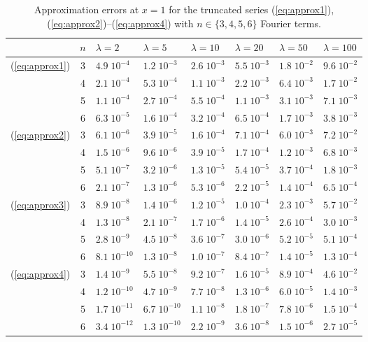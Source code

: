 \documentclass{article}
\begin{document}
\begin{table}
\begin{tabular}{|c|c|llllll|}
\hline
 & $n$ & $\lambda=2$ & $\lambda=5$ & $\lambda=10$ & $\lambda=20$ & $\lambda=50$ & $\lambda=100$ \\
\hline
(\ref{eq:approx1}) & 3 & $4.9\;10^{-4}$ & $1.2\;10^{-3}$ & $2.6\;10^{-3}$ & $5.5\;10^{-3}$ & $1.8\;10^{-2}$ & $9.6\;10^{-2}$ \\
& 4 & $2.1\;10^{-4}$ & $5.3\;10^{-4}$ & $1.1\;10^{-3}$ & $2.2\;10^{-3}$ & $6.4\;10^{-3}$ & $1.7\;10^{-2}$ \\
& 5 & $1.1\;10^{-4}$ & $2.7\;10^{-4}$ & $5.5\;10^{-4}$ & $1.1\;10^{-3}$ & $3.1\;10^{-3}$ & $7.1\;10^{-3}$ \\
& 6 & $6.3\;10^{-5}$ & $1.6\;10^{-4}$ & $3.2\;10^{-4}$ & $6.5\;10^{-4}$ & $1.7\;10^{-3}$ & $3.8\;10^{-3}$ \\
\hline
(\ref{eq:approx2}) & 3 & $6.1\;10^{-6}$ & $3.9\;10^{-5}$ & $1.6\;10^{-4}$ & $7.1\;10^{-4}$ & $6.0\;10^{-3}$ & $7.2\;10^{-2}$ \\
& 4 & $1.5\;10^{-6}$ & $9.6\;10^{-6}$ & $3.9\;10^{-5}$ & $1.7\;10^{-4}$ & $1.2\;10^{-3}$ & $6.8\;10^{-3}$ \\
& 5 & $5.1\;10^{-7}$ & $3.2\;10^{-6}$ & $1.3\;10^{-5}$ & $5.4\;10^{-5}$ & $3.7\;10^{-4}$ & $1.8\;10^{-3}$ \\
& 6 & $2.1\;10^{-7}$ & $1.3\;10^{-6}$ & $5.3\;10^{-6}$ & $2.2\;10^{-5}$ & $1.4\;10^{-4}$ & $6.5\;10^{-4}$ \\
\hline
(\ref{eq:approx3}) & 3 & $8.9\;10^{-8}$ & $1.4\;10^{-6}$ & $1.2\;10^{-5}$ & $1.0\;10^{-4}$ & $2.3\;10^{-3}$ & $5.7\;10^{-2}$ \\
& 4 & $1.3\;10^{-8}$ & $2.1\;10^{-7}$ & $1.7\;10^{-6}$ & $1.4\;10^{-5}$ & $2.6\;10^{-4}$ & $3.0\;10^{-3}$ \\
& 5 & $2.8\;10^{-9}$ & $4.5\;10^{-8}$ & $3.6\;10^{-7}$ & $3.0\;10^{-6}$ & $5.2\;10^{-5}$ & $5.1\;10^{-4}$ \\
& 6 & $8.1\;10^{-10}$ & $1.3\;10^{-8}$ & $1.0\;10^{-7}$ & $8.4\;10^{-7}$ & $1.4\;10^{-5}$ & $1.3\;10^{-4}$ \\
\hline
(\ref{eq:approx4}) & 3 & $1.4\;10^{-9}$ & $5.5\;10^{-8}$ & $9.2\;10^{-7}$ & $1.6\;10^{-5}$ & $8.9\;10^{-4}$ & $4.6\;10^{-2}$ \\
& 4 & $1.2\;10^{-10}$ & $4.7\;10^{-9}$ & $7.7\;10^{-8}$ & $1.3\;10^{-6}$ & $6.0\;10^{-5}$ & $1.4\;10^{-3}$ \\
& 5 & $1.7\;10^{-11}$ & $6.7\;10^{-10}$ & $1.1\;10^{-8}$ & $1.8\;10^{-7}$ & $7.8\;10^{-6}$ & $1.5\;10^{-4}$ \\
& 6 & $3.4\;10^{-12}$ & $1.3\;10^{-10}$ & $2.2\;10^{-9}$ & $3.6\;10^{-8}$ & $1.5\;10^{-6}$ & $2.7\;10^{-5}$ \\
\hline
\end{tabular}
\caption{Approximation errors at $x=1$  for the truncated series (\ref{eq:approx1}), (\ref{eq:approx2})--(\ref{eq:approx4})
with $n\in\{3,4,5,6\}$ Fourier terms.}
 \label{tb:approx}
\end{table}
\end{document}
